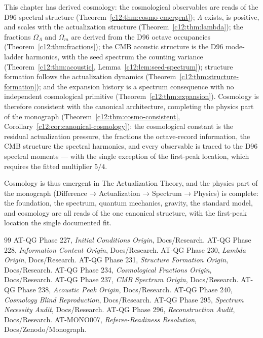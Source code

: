 This chapter has derived cosmology: the cosmological observables are reads of the D96
spectral structure (Theorem~\ref{c12:thm:cosmo-emergent}); $\Lambda$ exists, is positive,
and scales with the actualization structure (Theorem~\ref{c12:thm:lambda}); the fractions
$\Omega_\Lambda$ and $\Omega_m$ are derived from the D96 octave occupancies
(Theorem~\ref{c12:thm:fractions}); the CMB acoustic structure is the D96 mode-ladder
harmonics, with the seed spectrum the counting variance (Theorem~\ref{c12:thm:acoustic},
Lemma~\ref{c12:lem:seed-spectrum}); structure formation follows the actualization dynamics
(Theorem~\ref{c12:thm:structure-formation}); and the expansion history is a spectrum
consequence with no independent cosmological primitive (Theorem~\ref{c12:thm:expansion}).
Cosmology is therefore consistent with the canonical architecture, completing the physics
part of the monograph (Theorem~\ref{c12:thm:cosmo-consistent},
Corollary~\ref{c12:cor:canonical-cosmology}): the cosmological constant is the residual
actualization pressure, the fractions the octave-record information, the CMB structure the
spectral harmonics, and every observable is traced to the D96 spectral moments --- with the
single exception of the first-peak location, which requires the fitted multiplier $5/4$.

Cosmology is thus emergent in The Actualization Theory, and the physics part of the
monograph (Difference → Actualization → Spectrum → Physics) is complete: the foundation, the
spectrum, quantum mechanics, gravity, the standard model, and cosmology are all reads of
the one canonical structure, with the first-peak location the single documented fit.

\begin{thebibliography}{99}
 AT-QG Phase 227, \emph{Initial Conditions Origin}, Docs/Research.
 AT-QG Phase 228, \emph{Information Content Origin}, Docs/Research.
 AT-QG Phase 230, \emph{Lambda Origin}, Docs/Research.
 AT-QG Phase 231, \emph{Structure Formation Origin}, Docs/Research.
 AT-QG Phase 234, \emph{Cosmological Fractions Origin}, Docs/Research.
 AT-QG Phase 237, \emph{CMB Spectrum Origin}, Docs/Research.
 AT-QG Phase 238, \emph{Acoustic Peak Origin}, Docs/Research.
 AT-QG Phase 240, \emph{Cosmology Blind Reproduction}, Docs/Research.
 AT-QG Phase 295, \emph{Spectrum Necessity Audit}, Docs/Research.
 AT-QG Phase 296, \emph{Reconstruction Audit}, Docs/Research.
 AT-MONO007, \emph{Referee-Readiness Resolution}, Docs/Zenodo/Monograph.
\end{thebibliography}
